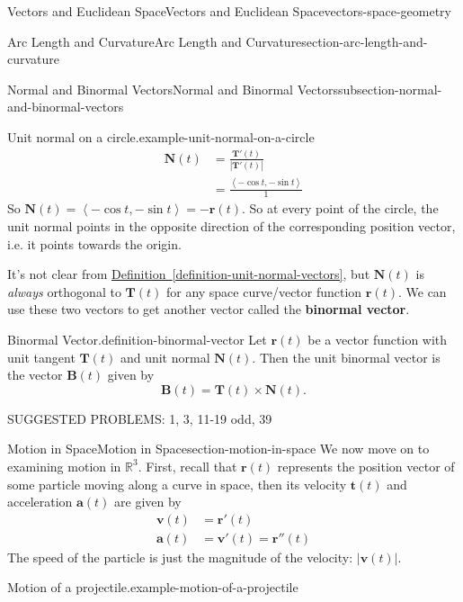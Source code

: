 \documentclass[oneside,10pt,]{book}
\newcommand{\terminology}[1]{\textbf{#1}}
\numberwithin{equation}{section}
\newcommand{\RR}{\mathbb{R}}
\newcommand{\vv}[1]{\mathbf{#1}}
\newcommand{\dotprod}[1]{\left\langle #1 \right\rangle}
\begin{document}
\begin{chapterptx}{Vectors and Euclidean Space}{}{Vectors and Euclidean Space}{}{}{vectors-space-geometry}
\begin{sectionptx}{Arc Length and Curvature}{}{Arc Length and Curvature}{}{}{section-arc-length-and-curvature}
\begin{subsectionptx}{Normal and Binormal Vectors}{}{Normal and Binormal Vectors}{}{}{subsection-normal-and-binormal-vectors}
\begin{example}{Unit normal on a circle.}{example-unit-normal-on-a-circle}
%
\begin{align*}
\vv{N}(t) & = \frac{\vv{T}'(t)}{|\vv{T}'(t)|} \\
& = \frac{\dotprod{-\cos t, -\sin t}}{1} 
\end{align*}
\hypertarget{p-1303}{}%
So \(\vv{N}(t) = \dotprod{-\cos t, -\sin t} = -\vv{r}(t)\). So at every point of the circle, the unit normal points in the opposite direction of the corresponding position vector, i.e. it points towards the origin.%
\end{example}
\hypertarget{p-1304}{}%
It's not clear from \hyperref[definition-unit-normal-vectors]{Definition~\ref{definition-unit-normal-vectors}}, but \(\vv{N}(t)\) is \emph{always} orthogonal to \(\vv{T}(t)\) for any space curve\slash{}vector function \(\vv{r}(t)\). We can use these two vectors to get another vector called the \terminology{binormal vector}.%
\begin{definition}{Binormal Vector.}{definition-binormal-vector}%
\hypertarget{p-1305}{}%
Let \(\vv{r}(t)\) be a vector function with unit tangent \(\vv{T}(t)\) and unit normal \(\vv{N}(t)\). Then the unit binormal vector is the vector \(\vv{B}(t)\) given by%
%
\begin{equation*}
\vv{B}(t) = \vv{T}(t)\times\vv{N}(t).
\end{equation*}
\end{definition}
\hypertarget{p-1306}{}%
SUGGESTED PROBLEMS: 1, 3, 11-19 odd, 39%
\end{subsectionptx}
\end{sectionptx}
%
%
\typeout{************************************************}
\typeout{************************************************}
%
\begin{sectionptx}{Motion in Space}{}{Motion in Space}{}{}{section-motion-in-space}
\hypertarget{p-1307}{}%
We now move on to examining motion in \(\RR^{3}\). First, recall that \(\vv{r}(t)\) represents the position vector of some particle moving along a curve in space, then its velocity \(\vv{t}(t)\) and acceleration \(\vv{a}(t)\) are given by%
%
\begin{align*}
\vv{v}(t) & = \vv{r}'(t) \\
\vv{a}(t) & = \vv{v}'(t) = \vv{r}''(t) 
\end{align*}
\hypertarget{p-1308}{}%
The speed of the particle is just the magnitude of the velocity: \(|\vv{v}(t)|\).%
\begin{example}{Motion of a projectile.}{example-motion-of-a-projectile}%

\end{example}
\end{sectionptx}
\end{chapterptx}
\end{document}
